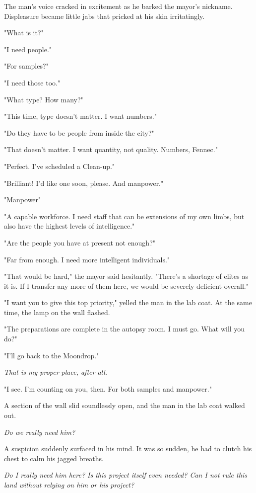 The man's voice cracked in excitement as he barked the mayor's nickname.
Displeasure became little jabs that pricked at his skin irritatingly.

"What is it?"

"I need people."

"For samples?"

"I need those too."

"What type? How many?"

"This time, type doesn't matter. I want numbers."

"Do they have to be people from inside the city?"

"That doesn't matter. I want quantity, not quality. Numbers, Fennec."

"Perfect. I've scheduled a Clean-up."

"Brilliant! I'd like one soon, please. And manpower."

"Manpower\el "

"A capable workforce. I need staff that can be extensions of my own
limbs, but also have the highest levels of intelligence."

"Are the people you have at present not enough?"

"Far from enough. I need more intelligent individuals."

"That would be hard," the mayor said hesitantly. "There's a shortage of
elites as it is. If I transfer any more of them here, we would be
severely deficient overall."

"I want you to give this top priority," yelled the man in the lab coat.
At the same time, the lamp on the wall flashed.

"The preparations are complete in the autopsy room. I must go. What will
you do?"

"I'll go back to the Moondrop."

\emph{That is my proper place, after all.}

"I see. I'm counting on you, then. For both samples and manpower."

A section of the wall slid soundlessly open, and the man in the lab coat
walked out.

\emph{Do we really need him?}

A suspicion suddenly surfaced in his mind. It was so sudden, he had to
clutch his chest to calm his jagged breaths.

\emph{Do I really need him here? Is this project itself even needed? Can I not
rule this land without relying on him or his project?}


